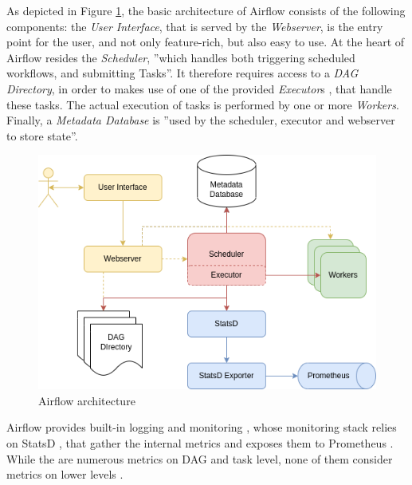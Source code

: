 \documentclass[lettersize,journal]{IEEEtran}
\begin{document}
	As depicted in Figure \ref{fig:aiflow:arch}, the basic architecture of Airflow consists of the following components: the \textit{User Interface}, that is served by the \textit{Webserver}, is the entry point for the user, and not only feature-rich, but also easy to use. At the heart of Airflow resides the \textit{Scheduler}, ''which handles both triggering scheduled workflows, and submitting Tasks''\cite{airflowArchitecture}. It therefore requires access to a \textit{DAG Directory}, in order to makes use of one of the provided \textit{Executor}s \cite{airflowExecutor}, that handle these tasks. The actual execution of tasks is performed by one or more \textit{Workers}. Finally, a \textit{Metadata Database} is ''used by the scheduler, executor and webserver to store state''\cite{airflowArchitecture}.
	\begin{figure}[h]
		\includegraphics[width=\linewidth]{images/airflow-architecture.png}
		\caption{Airflow architecture \cite{airflowArchitecture}}
		\label{fig:aiflow:arch}
	\end{figure}
	
	Airflow provides built-in logging and monitoring \cite{airflowMonitoring}, whose monitoring stack relies on StatsD \cite{statsd}, that gather the internal metrics and exposes them to Prometheus \cite{prometheus}. While the are numerous metrics on DAG and task level, none of them consider metrics on lower levels \cite{airflowMetrics}.
	
\end{document}
